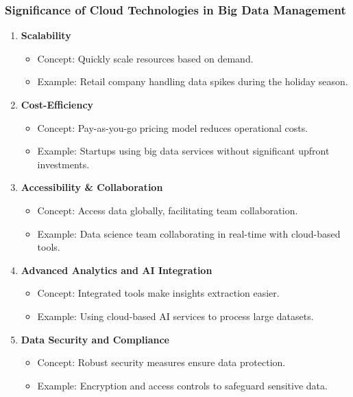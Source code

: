 \documentclass[aspectratio=169]{beamer}
\begin{document}
\begin{frame}[fragile]
    \frametitle{Significance of Cloud Technologies in Big Data Management}
    \begin{enumerate}
        \item \textbf{Scalability}
        \begin{itemize}
            \item Concept: Quickly scale resources based on demand.
            \item Example: Retail company handling data spikes during the holiday season.
        \end{itemize}
        
        \item \textbf{Cost-Efficiency}
        \begin{itemize}
            \item Concept: Pay-as-you-go pricing model reduces operational costs.
            \item Example: Startups using big data services without significant upfront investments.
        \end{itemize}
        
        \item \textbf{Accessibility \& Collaboration}
        \begin{itemize}
            \item Concept: Access data globally, facilitating team collaboration.
            \item Example: Data science team collaborating in real-time with cloud-based tools.
        \end{itemize}
        
        \item \textbf{Advanced Analytics and AI Integration}
        \begin{itemize}
            \item Concept: Integrated tools make insights extraction easier.
            \item Example: Using cloud-based AI services to process large datasets.
        \end{itemize}
        
        \item \textbf{Data Security and Compliance}
        \begin{itemize}
            \item Concept: Robust security measures ensure data protection.
            \item Example: Encryption and access controls to safeguard sensitive data.
        \end{itemize}
    \end{enumerate}
\end{frame}
\end{document}
